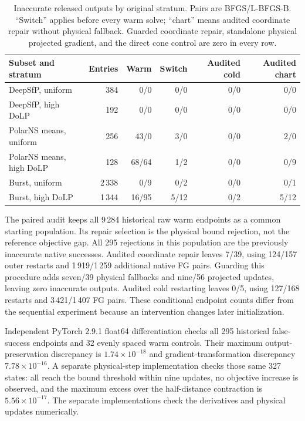 \begin{table}[!t]
\caption{Inaccurate released outputs by original stratum. Pairs are BFGS/L-BFGS-B. ``Switch'' applies before every warm solve; ``chart'' means audited coordinate repair without physical fallback. Guarded coordinate repair, standalone physical projected gradient, and the direct cone control are zero in every row.}
\label{tab:chartstrata}
\centering\small\renewcommand{\arraystretch}{1.12}
\begin{tabularx}{\textwidth}{@{}Xrrrrr@{}}\toprule
Subset and stratum & Entries & Warm & Switch & Audited cold & Audited chart\\\midrule
DeepSfP, uniform & 384 & 0/0 & 0/0 & 0/0 & 0/0\\
DeepSfP, high DoLP & 192 & 0/0 & 0/0 & 0/0 & 0/0\\
PolarNS means, uniform & 256 & 43/0 & 3/0 & 0/0 & 2/0\\
PolarNS means, high DoLP & 128 & 68/64 & 1/2 & 0/0 & 0/9\\
Burst, uniform & 2\,338 & 0/9 & 0/2 & 0/0 & 0/1\\
Burst, high DoLP & 1\,344 & 16/95 & 5/12 & 0/2 & 5/12\\
\bottomrule\end{tabularx}
\end{table}

The paired audit keeps all 9\,284 historical raw warm endpoints as a common starting population. Its repair selection is the physical bound rejection, not the reference objective gap. All 295 rejections in this population are the previously inaccurate native successes. Audited coordinate repair leaves 7/39, using 124/157 outer restarts and 1\,919/1\,259 additional native FG pairs. Guarding this procedure adds seven/39 physical fallbacks and nine/56 projected updates, leaving zero inaccurate outputs. Audited cold restarting leaves 0/5, using 127/168 restarts and 3\,421/1\,407 FG pairs. These conditional endpoint counts differ from the sequential experiment because an intervention changes later initialization.

Independent PyTorch 2.9.1 float64 differentiation checks all 295 historical false-success endpoints and 32 evenly spaced warm controls. Their maximum output-preservation discrepancy is $1.74\times10^{-18}$ and gradient-transformation discrepancy $7.78\times10^{-16}$. A separate physical-step implementation checks those same 327 states: all reach the bound threshold within nine updates, no objective increase is observed, and the maximum excess over the half-distance contraction is $5.56\times10^{-17}$. The separate implementations check the derivatives and physical updates numerically.


